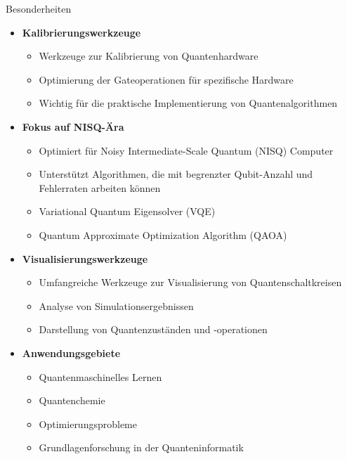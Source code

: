 Besonderheiten
\begin{itemize}
    \item \textbf{Kalibrierungswerkzeuge}
    \begin{itemize}
        \item Werkzeuge zur Kalibrierung von Quantenhardware
        \item Optimierung der Gateoperationen für spezifische Hardware
        \item Wichtig für die praktische Implementierung von Quantenalgorithmen
    \end{itemize}
    
    \item \textbf{Fokus auf NISQ-Ära}
    \begin{itemize}
        \item Optimiert für Noisy Intermediate-Scale Quantum (NISQ) Computer
        \item Unterstützt Algorithmen, die mit begrenzter Qubit-Anzahl und Fehlerraten arbeiten können
        \item Variational Quantum Eigensolver (VQE)
        \item Quantum Approximate Optimization Algorithm (QAOA)
    \end{itemize}
    
    \item \textbf{Visualisierungswerkzeuge}
    \begin{itemize}
        \item Umfangreiche Werkzeuge zur Visualisierung von Quantenschaltkreisen
        \item Analyse von Simulationsergebnissen
        \item Darstellung von Quantenzuständen und -operationen
    \end{itemize}
    
    \item \textbf{Anwendungsgebiete}
    \begin{itemize}
        \item Quantenmaschinelles Lernen
        \item Quantenchemie
        \item Optimierungsprobleme
        \item Grundlagenforschung in der Quanteninformatik
    \end{itemize}
\end{itemize}

